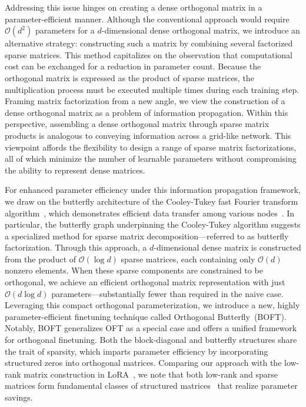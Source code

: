 Addressing this issue hinges on creating a dense orthogonal matrix in a parameter-efficient manner. Although the conventional approach would require $\mathcal{O}(d^2)$ parameters for a $d$-dimensional dense orthogonal matrix, we introduce an alternative strategy: constructing such a matrix by combining several factorized sparse matrices. This method capitalizes on the observation that computational cost can be exchanged for a reduction in parameter count. Because the orthogonal matrix is expressed as the product of sparse matrices, the multiplication process must be executed multiple times during each training step. Framing matrix factorization from a new angle, we view the construction of a dense orthogonal matrix as a problem of information propagation. Within this perspective, assembling a dense orthogonal matrix through sparse matrix products is analogous to conveying information across a grid-like network. This viewpoint affords the flexibility to design a range of sparse matrix factorizations, all of which minimize the number of learnable parameters without compromising the ability to represent dense matrices.

For enhanced parameter efficiency under this information propagation framework, we draw on the butterfly architecture of the Cooley-Tukey fast Fourier transform algorithm~\cite{cooley1965algorithm}, which demonstrates efficient data transfer among various nodes~\cite{klasing1994broadcasting}. In particular, the butterfly graph underpinning the Cooley-Tukey algorithm suggests a specialized method for sparse matrix decomposition—referred to as butterfly factorization. Through this approach, a $d$-dimensional dense matrix is constructed from the product of $\mathcal{O}(\log d)$ sparse matrices, each containing only $\mathcal{O}(d)$ nonzero elements. When these sparse components are constrained to be orthogonal, we achieve an efficient orthogonal matrix representation with just $\mathcal{O}(d\log d)$ parameters—substantially fewer than required in the naive case. Leveraging this compact orthogonal parameterization, we introduce a new, highly parameter-efficient finetuning technique called Orthogonal Butterfly~(BOFT). Notably, BOFT generalizes OFT as a special case and offers a unified framework for orthogonal finetuning. Both the block-diagonal and butterfly structures share the trait of sparsity, which imparts parameter efficiency by incorporating structured zeros into orthogonal matrices. Comparing our approach with the low-rank matrix construction in LoRA~\cite{hulora2022}, we note that both low-rank and sparse matrices form fundamental classes of structured matrices~\cite{candes2011robust} that realize parameter savings.

